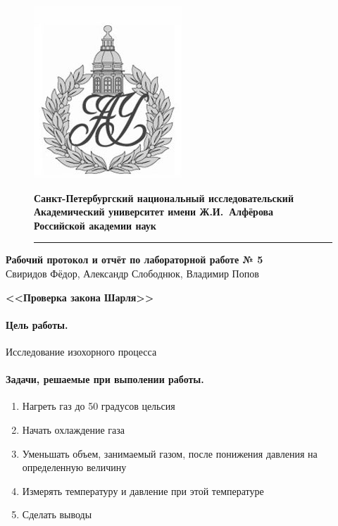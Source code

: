 \documentclass[a4paper]{article}
\begin{document}
	\begin{figure}[htb]
		\begin{minipage}[c]{0.12\textwidth}
			\includegraphics[scale=0.25]{AU}
		\end{minipage}
\hfill
		\begin{minipage}[t]{0.9\textwidth}
			{\Large\bfseries Санкт-Петербургский национальный исследовательский Академический университет имени Ж.И.~Алфёрова\\Российской академии наук}
		\end{minipage}
	\rule{164mm}{0.3mm}
	\end{figure}

	\begin{center}
		{\large\textbf{Рабочий протокол и отчёт по лабораторной работе № 5}}\\
		Свиридов Фёдор, Александр Слободнюк, Владимир Попов
	\end{center}
	\begin{center}
	\Large\bfseries{<<Проверка закона Шарля>>}\\
	\end{center}
	\paragraph{Цель работы.} Исследование изохорного процесса
	\paragraph{Задачи, решаемые при выполении работы.}
	\begin{enumerate}
		\item Нагреть газ до 50 градусов цельсия
		\item Начать охлаждение газа
		\item Уменьшать объем, занимаемый газом, после понижения давления на определенную величину
		\item Измерять температуру и давление при этой температуре
		\item Сделать выводы
	\end{enumerate}
\end{document}
